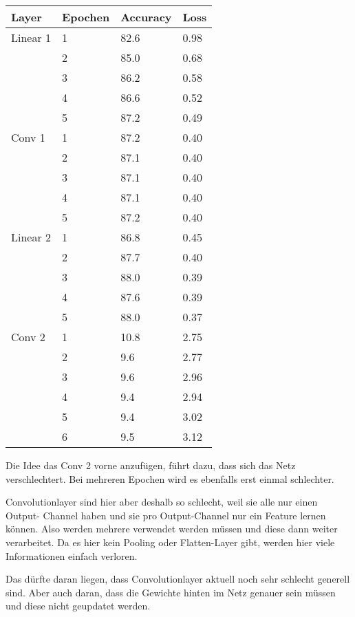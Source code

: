     \begin{table}[h!]
        \begin{tabular}{l|l|l|l}
            Layer & Epochen & Accuracy & Loss \\
            \hline
            Linear 1 & 1 & 82.6 & 0.98 \\
            & 2 & 85.0 & 0.68 \\
            & 3 & 86.2 & 0.58 \\
            & 4 & 86.6 & 0.52 \\
            & 5 & 87.2 & 0.49\\
            Conv 1 & 1 & 87.2 & 0.40 \\
            & 2 & 87.1 & 0.40 \\
            & 3 & 87.1 & 0.40 \\
            & 4 & 87.1 & 0.40 \\
            & 5 & 87.2 & 0.40 \\
            Linear 2 & 1 & 86.8 & 0.45 \\
            & 2 & 87.7 & 0.40 \\
            & 3 & 88.0 & 0.39 \\
            & 4 & 87.6 & 0.39 \\
            & 5 & 88.0 & 0.37 \\
            Conv 2 & 1 & 10.8 & 2.75 \\
            & 2 & 9.6 & 2.77 \\
            & 3 & 9.6 & 2.96 \\
            & 4 & 9.4 & 2.94 \\
            & 5 & 9.4 & 3.02 \\
            & 6 & 9.5 & 3.12 \\
        \end{tabular}
    \end{table}

    Die Idee das Conv 2 vorne anzufügen, führt dazu, dass sich das Netz verschlechtert. 
    Bei mehreren Epochen wird es ebenfalls erst einmal schlechter.


    Convolutionlayer sind hier aber deshalb so schlecht, weil sie alle nur einen Output-
    Channel haben und sie pro Output-Channel nur ein Feature lernen können.
    Also werden mehrere verwendet werden müssen und diese dann weiter verarbeitet. 
    Da es hier kein Pooling oder Flatten-Layer gibt, werden hier viele Informationen 
    einfach verloren.


    Das dürfte daran liegen, dass Convolutionlayer aktuell noch sehr schlecht generell sind. 
    Aber auch daran, dass die Gewichte hinten im Netz genauer sein müssen und diese nicht 
    geupdatet werden. 
